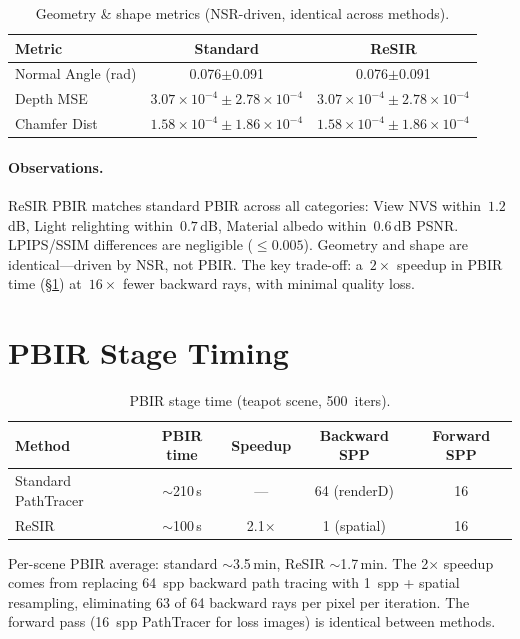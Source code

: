 \begin{table}[ht]
\centering
\caption{Geometry \& shape metrics (NSR-driven, identical across methods).}
\label{tab:geo}
\footnotesize
\begin{tabular}{@{}lS[round-precision=3]S[round-precision=3]@{}}
\toprule
Metric & Standard & ReSIR \\
\midrule
Normal Angle (rad) & 0.076$\pm$0.091 & 0.076$\pm$0.091 \\
Depth MSE & $3.07\times10^{-4}\pm2.78\times10^{-4}$ & $3.07\times10^{-4}\pm2.78\times10^{-4}$ \\
Chamfer Dist & $1.58\times10^{-4}\pm1.86\times10^{-4}$ & $1.58\times10^{-4}\pm1.86\times10^{-4}$ \\
\bottomrule
\end{tabular}
\end{table}

\paragraph{Observations.} ReSIR PBIR matches standard PBIR across all
categories: View NVS within~$1.2$\,dB, Light relighting within~$0.7$\,dB,
Material albedo within~$0.6$\,dB PSNR. LPIPS/SSIM differences are
negligible ($\le0.005$). Geometry and shape are identical---driven by NSR,
not PBIR. The key trade-off: a~$2\times$ speedup in PBIR time
(\S\ref{sec:time}) at~$16\times$ fewer backward rays, with minimal quality
loss.

\section{PBIR Stage Timing}
\label{sec:time}

\begin{table}[ht]
\centering
\caption{PBIR stage time (teapot scene, 500~iters).}
\label{tab:time}
\footnotesize
\begin{tabular}{@{}lcccc@{}}
\toprule
Method & PBIR time & Speedup & Backward SPP & Forward SPP \\
\midrule
Standard PathTracer & $\sim$210\,s & --- & 64 (renderD) & 16 \\
ReSIR               & $\sim$100\,s & 2.1$\times$ & 1 (spatial) & 16 \\
\bottomrule
\end{tabular}
\end{table}

Per-scene PBIR average: standard $\sim$3.5\,min, ReSIR $\sim$1.7\,min. The
2$\times$ speedup comes from replacing 64~spp backward path tracing with
1~spp + spatial resampling, eliminating 63 of 64 backward rays per pixel per
iteration. The forward pass (16~spp PathTracer for loss images) is identical
between methods.
